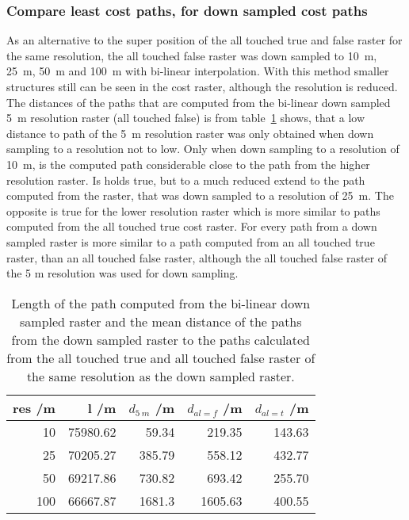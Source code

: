 \subsubsection{Compare least cost paths, for down sampled cost paths}

As an alternative to the super position of the all touched true and false raster for the same resolution, the all touched false raster was down sampled to 10~m, 25~m, 50~m and 100~m with bi-linear interpolation.
With this method smaller structures still can be seen in the cost raster, although the resolution is reduced.
The distances of the paths that are computed from the bi-linear down sampled  5~m resolution raster (all touched false) is from table~\ref{tab:5} shows, that a low distance to path of the 5~m resolution raster was only obtained when down sampling to a resolution not to low.
Only when down sampling to a resolution of 10~m, is the computed path considerable close to the path from the higher resolution raster.
Is holds true, but to a much reduced extend to the path computed from the raster, that was down sampled to a resolution of 25~m.
The opposite is true for the lower resolution raster which is more similar to paths computed from the all touched true cost raster.
For every path from a down sampled raster is more similar to a path computed from an all touched true raster, than an all touched false raster, although the all touched false raster of the 5 m resolution was used for down sampling.

\begin{table}[h!]
	\caption{Length of the path computed from the bi-linear down sampled raster and the mean distance of the paths from the down sampled raster to the paths calculated from the all touched true and all touched false raster of the same resolution as the down sampled raster.}
	\label{tab:5}
	\centering
	\begin{tabular}{ r  r  r  r  r}
		res /m & l /m  & $d_{5~m}$ /m &  $d_{al=f}$ /m & $d_{al=t}$ /m \\
		\hline
		
		10  & 75980.62 &   59.34 &  219.35 & 143.63\\
		25  & 70205.27 &  385.79 &  558.12 & 432.77\\
		50  & 69217.86 &  730.82 &  693.42 & 255.70\\
		100 & 66667.87 &  1681.3 & 1605.63 & 400.55\\
		
	\end{tabular}
\end{table}


